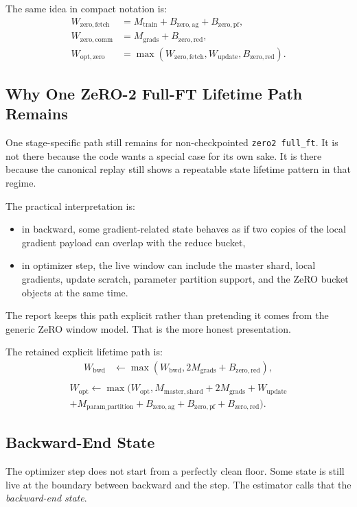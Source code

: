 The same idea in compact notation is:
\begin{align*}
W_{\mathrm{zero,fetch}} &=
M_{\mathrm{train}} + B_{\mathrm{zero,ag}} + B_{\mathrm{zero,pf}}, \\
W_{\mathrm{zero,comm}} &=
M_{\mathrm{grads}} + B_{\mathrm{zero,red}}, \\
W_{\mathrm{opt,zero}} &=
\max\!\left(
W_{\mathrm{zero,fetch}},
W_{\mathrm{update}},
B_{\mathrm{zero,red}}
\right).
\end{align*}

\subsection{Why One ZeRO-2 Full-FT Lifetime Path Remains}
One stage-specific path still remains for non-checkpointed \texttt{zero2
full\_ft}. It is not there because the code wants a special case for its own
sake. It is there because the canonical replay still shows a repeatable state
lifetime pattern in that regime.

The practical interpretation is:
\begin{itemize}[leftmargin=1.5em]
\item in backward, some gradient-related state behaves as if two copies of the
local gradient payload can overlap with the reduce bucket,
\item in optimizer step, the live window can include the master shard, local
gradients, update scratch, parameter partition support, and the ZeRO bucket
objects at the same time.
\end{itemize}

The report keeps this path explicit rather than pretending it comes from the
generic ZeRO window model. That is the more honest presentation.

The retained explicit lifetime path is:
\begin{align*}
W_{\mathrm{bwd}} &\leftarrow
\max\!\left(W_{\mathrm{bwd}}, 2 M_{\mathrm{grads}} + B_{\mathrm{zero,red}}\right), \\
\end{align*}
\begin{multline*}
W_{\mathrm{opt}} \leftarrow
\max\!\Big(
W_{\mathrm{opt}},
M_{\mathrm{master,shard}}
+ 2 M_{\mathrm{grads}}
+ W_{\mathrm{update}} \\
+ M_{\mathrm{param\_partition}}
+ B_{\mathrm{zero,ag}}
+ B_{\mathrm{zero,pf}}
+ B_{\mathrm{zero,red}}
\Big).
\end{multline*}

\subsection{Backward-End State}
The optimizer step does not start from a perfectly clean floor. Some state is
still live at the boundary between backward and the step. The estimator calls
that the \emph{backward-end state}.

